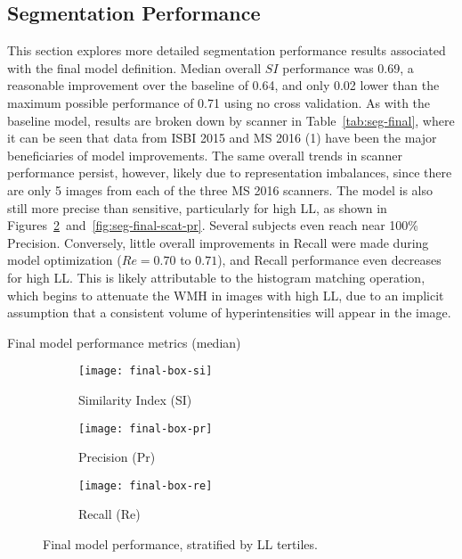 \subsection{Segmentation Performance}\label{ss:exp-finalseg}
This section explores more detailed segmentation performance results
associated with the final model definition.
Median overall $SI$ performance was 0.69, a reasonable improvement over the baseline of 0.64,
and only 0.02 lower than the maximum possible performance of 0.71 using no cross validation.
As with the baseline model, results are broken down by scanner in Table~\ref{tab:seg-final},
where it can be seen that data from ISBI 2015 and MS 2016 (1)
have been the major beneficiaries of model improvements.
The same overall trends in scanner performance persist, however,
likely due to representation imbalances,
since there are only 5 images from each of the three MS 2016 scanners.
The model is also still more precise than sensitive,
particularly for high LL, as shown in
Figures~\ref{fig:seg-final-pr}~and~\ref{fig:seg-final-scat-pr}.
Several subjects even reach near 100\% Precision.
Conversely, little overall improvements in Recall
were made during model optimization ($Re = 0.70$ to $0.71$),
and Recall performance even decreases for high LL.
This is likely attributable to the histogram matching operation,
which begins to attenuate the WMH in images with high LL,
due to an implicit assumption that a consistent volume of hyperintensities will
appear in the image.
\par
\begin{table}
  \centering
  \caption{Final model performance metrics (median)}%
  \label{tab:seg-final}
  
\end{table}
\begin{figure}
  \centering
  \begin{subfigure}{0.32\textwidth}
    \centering
    \texttt{[image: final-box-si]}
    \caption{Similarity Index (SI)}%
    \label{fig:seg-final-si}
  \end{subfigure}
  \begin{subfigure}{0.32\textwidth}
    \centering
    \texttt{[image: final-box-pr]}
    \caption{Precision (Pr)}%
    \label{fig:seg-final-pr}
  \end{subfigure}
  \begin{subfigure}{0.32\textwidth}
    \centering
    \texttt{[image: final-box-re]}
    \caption{Recall (Re)}%
    \label{fig:seg-final-re}
  \end{subfigure}
  \caption{Final model performance, stratified by LL tertiles.}%
  \label{fig:seg-final}
\end{figure}
